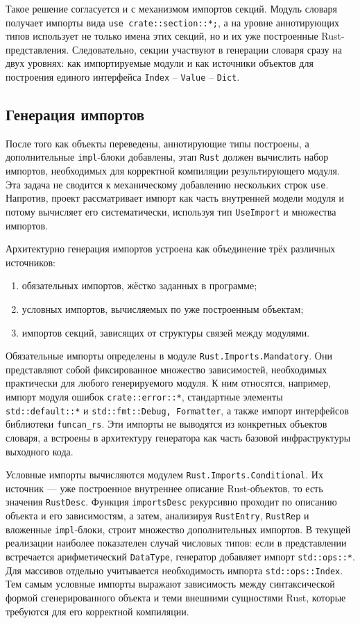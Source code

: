 \documentclass[a4paper,12pt]{article}
\begin{document}
Такое решение согласуется и с механизмом импортов секций. Модуль словаря получает
импорты вида \texttt{use crate::section::*;}, а на уровне аннотирующих типов использует
не только имена этих секций, но и их уже построенные Rust-представления. Следовательно,
секции участвуют в генерации словаря сразу на двух уровнях: как импортируемые модули и
как источники объектов для построения единого интерфейса \texttt{Index} -- \texttt{Value}
-- \texttt{Dict}.

\subsection{Генерация импортов}

После того как объекты переведены, аннотирующие типы построены, а дополнительные
\texttt{impl}-блоки добавлены, этап \texttt{Rust} должен вычислить набор импортов,
необходимых для корректной компиляции результирующего модуля. Эта задача не сводится к
механическому добавлению нескольких строк \texttt{use}. Напротив, проект рассматривает
импорт как часть внутренней модели модуля и потому вычисляет его систематически,
используя тип \texttt{UseImport} и множества импортов.

Архитектурно генерация импортов устроена как объединение трёх различных источников:
\begin{enumerate}
  \item обязательных импортов, жёстко заданных в программе;
  \item условных импортов, вычисляемых по уже построенным объектам;
  \item импортов секций, зависящих от структуры связей между модулями.
\end{enumerate}

Обязательные импорты определены в модуле \texttt{Rust.Imports.Mandatory}. Они
представляют собой фиксированное множество зависимостей, необходимых практически для
любого генерируемого модуля. К ним относятся, например, импорт модуля ошибок
\texttt{crate::error::*}, стандартные элементы \texttt{std::default::*} и
\texttt{std::fmt::{Debug, Formatter}}, а также импорт интерфейсов библиотеки
\texttt{funcan\_rs}. Эти импорты не выводятся из конкретных объектов словаря, а
встроены в архитектуру генератора как часть базовой инфраструктуры выходного кода.

Условные импорты вычисляются модулем \texttt{Rust.Imports.Conditional}. Их источник ---
уже построенное внутреннее описание Rust-объектов, то есть значения \texttt{RustDesc}.
Функция \texttt{importsDesc} рекурсивно проходит по описанию объекта и его
зависимостям, а затем, анализируя \texttt{RustEntry}, \texttt{RustRep} и вложенные
\texttt{impl}-блоки, строит множество дополнительных импортов. В текущей реализации
наиболее показателен случай числовых типов: если в представлении встречается
арифметический \texttt{DataType}, генератор добавляет импорт \texttt{std::ops::*}. Для
массивов отдельно учитывается необходимость импорта \texttt{std::ops::Index}. Тем самым
условные импорты выражают зависимость между синтаксической формой сгенерированного
объекта и теми внешними сущностями Rust, которые требуются для его корректной
компиляции.
\end{document}

